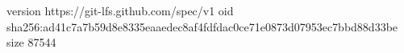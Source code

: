 version https://git-lfs.github.com/spec/v1
oid sha256:ad41c7a7b59d8e8335eaaedec8af4fdfdac0ce71e0873d07953ec7bbd88d33be
size 87544
